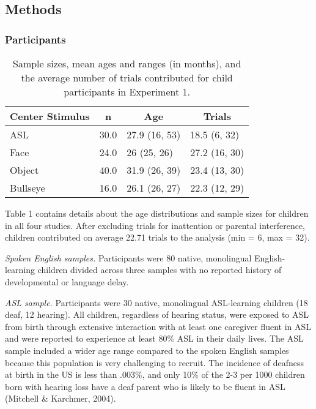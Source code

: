 \documentclass[,man,floatsintext]{apa6}
\begin{document}
\hypertarget{methods}{%
\subsection{Methods}\label{methods}}

\hypertarget{participants}{%
\subsubsection{Participants}\label{participants}}

\begin{table}[tbp]
\begin{center}
\begin{threeparttable}
\caption{\label{tab:trio make participants table}Sample sizes, mean ages and ranges (in months), and the average number of trials contributed for child participants in Experiment 1.}
\begin{tabular}{llll}
\toprule
Center Stimulus & \multicolumn{1}{c}{n} & \multicolumn{1}{c}{Age} & \multicolumn{1}{c}{Trials}\\
\midrule
ASL & 30.0 & 27.9 (16, 53) & 18.5 (6, 32)\\
Face & 24.0 & 26 (25, 26) & 27.2 (16, 30)\\
Object & 40.0 & 31.9 (26, 39) & 23.4 (13, 30)\\
Bullseye & 16.0 & 26.1 (26, 27) & 22.3 (12, 29)\\
\bottomrule
\end{tabular}
\end{threeparttable}
\end{center}
\end{table}

Table 1 contains details about the age distributions and sample sizes for children in all four studies. After excluding trials for inattention or parental interference, children contributed on average 22.71 trials to the analysis (min = 6, max = 32).

\emph{Spoken English samples.} Participants were 80 native, monolingual English-learning children divided across three samples with no reported history of developmental or language delay.

\emph{ASL sample.} Participants were 30 native, monolingual ASL-learning children (18 deaf, 12 hearing). All children, regardless of hearing status, were exposed to ASL from birth through extensive interaction with at least one caregiver fluent in ASL and were reported to experience at least 80\% ASL in their daily lives. The ASL sample included a wider age range compared to the spoken English samples because this population is very challenging to recruit. The incidence of deafness at birth in the US is less than .003\%, and only 10\% of the 2-3 per 1000 children born with hearing loss have a deaf parent who is likely to be fluent in ASL (Mitchell \& Karchmer, 2004).
\end{document}
